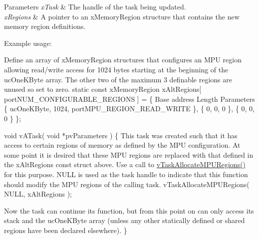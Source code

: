 \begin{DoxyParams}{Parameters}
{\em x\-Task} & The handle of the task being updated.\\
\hline
{\em x\-Regions} & A pointer to an x\-Memory\-Region structure that contains the new memory region definitions.\\
\hline
\end{DoxyParams}
Example usage\-: 
\begin{DoxyPre}
Define an array of xMemoryRegion structures that configures an MPU region
allowing read/write access for 1024 bytes starting at the beginning of the
ucOneKByte array.  The other two of the maximum 3 definable regions are
unused so set to zero.
static const xMemoryRegion xAltRegions[ portNUM\_CONFIGURABLE\_REGIONS ] =
\{                                           
Base address        Length      Parameters
    \{ ucOneKByte,       1024,       portMPU\_REGION\_READ\_WRITE \},
    \{ 0,                0,          0 \},
    \{ 0,                0,          0 \}
\};\end{DoxyPre}



\begin{DoxyPre}void vATask( void *pvParameters )
\{
This task was created such that it has access to certain regions of
memory as defined by the MPU configuration.  At some point it is
desired that these MPU regions are replaced with that defined in the
xAltRegions const struct above.  Use a call to \hyperlink{task_8h_a4fd3da9cc010ebb08743f613763c7924}{vTaskAllocateMPURegions()}
for this purpose.  NULL is used as the task handle to indicate that this
function should modify the MPU regions of the calling task.
    vTaskAllocateMPURegions( NULL, xAltRegions );\end{DoxyPre}



\begin{DoxyPre}Now the task can continue its function, but from this point on can only
access its stack and the ucOneKByte array (unless any other statically
defined or shared regions have been declared elsewhere).
\}
   \end{DoxyPre}
 